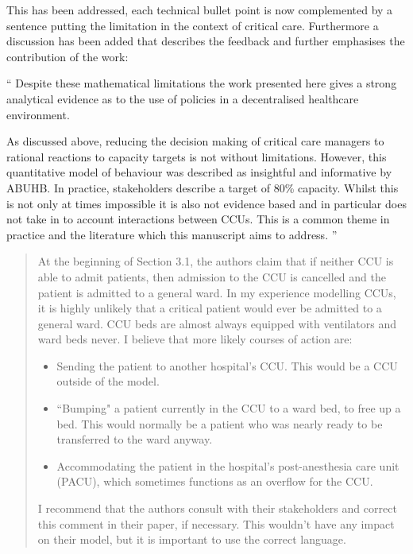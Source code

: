 \documentclass{article}
\begin{document}
This has been addressed, each technical bullet point is now complemented by a
sentence putting the limitation in the context of critical care. Furthermore a
discussion has been added that describes the feedback and further emphasises the
contribution of the work:

``
Despite these mathematical limitations the work presented here gives a strong
analytical evidence as to the use of policies in a decentralised healthcare
environment.

As discussed above, reducing the decision making of critical care managers to
rational reactions to capacity targets is not without limitations. However, this
quantitative model of behaviour was described as insightful and informative by
ABUHB. In practice, stakeholders describe a target of 80\% capacity. Whilst this
is not only at times impossible it is also not evidence based and in particular
does not take in to account interactions between CCUs. This is a common theme in
practice and the literature which this manuscript aims to address.
''

\begin{quote}
    \begin{textit}
        {
        At the beginning of Section 3.1, the authors claim that if neither CCU
        is able to admit patients, then admission to the CCU is cancelled and
        the patient is admitted to a general ward. In my experience modelling
        CCUs, it is highly unlikely that a critical patient would ever be
        admitted to a general ward.  CCU beds are almost always equipped with
        ventilators and ward beds never. I believe that more likely courses of
        action are:
        \begin{itemize}
         \item Sending the patient to another hospital's CCU.  This would be a CCU
           outside of the model.
         \item ``Bumping" a patient currently in the CCU to a ward bed, to free up
           a bed. This would normally be a patient who was nearly ready to be
           transferred to the ward anyway.
         \item Accommodating the patient in the hospital's post-anesthesia care
           unit (PACU), which sometimes functions as an overflow for the CCU.
        \end{itemize}
        I recommend that the authors consult with their stakeholders and
        correct this comment in their paper, if necessary.  This wouldn't have
        any impact on their model, but it is important to use the correct
        language.
        }
    \end{textit}
\end{quote}
\end{document}
